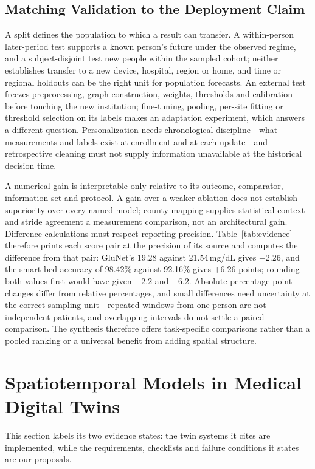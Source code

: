 \documentclass[journal]{IEEEtran}
\begin{document}
\subsection{Matching Validation to the Deployment Claim}
\label{sec:validationclaim}
\label{sec:effectinterpretation}
A split defines the population to which a result can transfer. A within-person later-period test supports a known person's future under the observed regime, and a subject-disjoint test new people within the sampled cohort; neither establishes transfer to a new device, hospital, region or home, and time or regional holdouts can be the right unit for population forecasts. An external test freezes preprocessing, graph construction, weights, thresholds and calibration before touching the new institution; fine-tuning, pooling, per-site fitting or threshold selection on its labels makes an adaptation experiment, which answers a different question. Personalization needs chronological discipline---what measurements and labels exist at enrollment and at each update---and retrospective cleaning must not supply information unavailable at the historical decision time.

A numerical gain is interpretable only relative to its outcome, comparator, information set and protocol. A gain over a weaker ablation does not establish superiority over every named model; county mapping supplies statistical context and stride agreement a measurement comparison, not an architectural gain. Difference calculations must respect reporting precision. Table~\ref{tab:evidence} therefore prints each score pair at the precision of its source and computes the difference from that pair: GluNet's 19.28 against 21.54\,mg/dL gives $-2.26$, and the smart-bed accuracy of 98.42\% against 92.16\% gives $+6.26$ points; rounding both values first would have given $-2.2$ and $+6.2$. Absolute percentage-point changes differ from relative percentages, and small differences need uncertainty at the correct sampling unit---repeated windows from one person are not independent patients, and overlapping intervals do not settle a paired comparison. The synthesis therefore offers task-specific comparisons rather than a pooled ranking or a universal benefit from adding spatial structure.

\section{Spatiotemporal Models in Medical Digital Twins}
\label{sec:DT}
This section labels its two evidence states: the twin systems it cites are implemented, while the requirements, checklists and failure conditions it states are our proposals.
\end{document}
